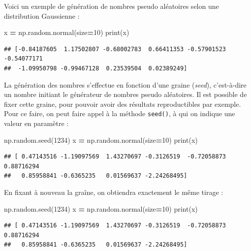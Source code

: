 \documentclass[12pt,]{book}
\newenvironment{Shaded}{\begin{snugshade}}{\end{snugshade}}
\newcommand{\DecValTok}[1]{\textcolor[rgb]{0.00,0.00,0.81}{#1}}
\newcommand{\OperatorTok}[1]{\textcolor[rgb]{0.81,0.36,0.00}{\textbf{#1}}}
\newcommand{\BuiltInTok}[1]{#1}
\newcommand{\NormalTok}[1]{#1}
\numberwithin{equation}{section}
\numberwithin{countremarque}{section}
\begin{document}
Voici un exemple de génération de nombres pseudo aléatoires selon une
distribution Gaussienne :

\begin{Shaded}
\begin{Highlighting}[]
\NormalTok{x }\OperatorTok{=}\NormalTok{ np.random.normal(size}\OperatorTok{=}\DecValTok{10}\NormalTok{)}
\BuiltInTok{print}\NormalTok{(x)}
\end{Highlighting}
\end{Shaded}

\begin{lstlisting}
## [-0.84187605  1.17502807 -0.68002783  0.66411353 -0.57901523 -0.54077171
##  -1.09950798 -0.99467128  0.23539504  0.02389249]
\end{lstlisting}

La génération des nombres s'effectue en fonction d'une graine
(\emph{seed}), c'est-à-dire un nombre initiant le générateur de nombres
pseudo aléatoires. Il est possible de fixer cette graine, pour pouvoir
avoir des résultats reproductibles par exemple. Pour ce faire, on peut
faire appel à la méthode \texttt{seed()}, à qui on indique une valeur en
paramètre :

\begin{Shaded}
\begin{Highlighting}[]
\NormalTok{np.random.seed(}\DecValTok{1234}\NormalTok{)}
\NormalTok{x }\OperatorTok{=}\NormalTok{ np.random.normal(size}\OperatorTok{=}\DecValTok{10}\NormalTok{)}
\BuiltInTok{print}\NormalTok{(x)}
\end{Highlighting}
\end{Shaded}

\begin{lstlisting}
## [ 0.47143516 -1.19097569  1.43270697 -0.3126519  -0.72058873  0.88716294
##   0.85958841 -0.6365235   0.01569637 -2.24268495]
\end{lstlisting}

En fixant à nouveau la graîne, on obtiendra exactement le même tirage :

\begin{Shaded}
\begin{Highlighting}[]
\NormalTok{np.random.seed(}\DecValTok{1234}\NormalTok{)}
\NormalTok{x }\OperatorTok{=}\NormalTok{ np.random.normal(size}\OperatorTok{=}\DecValTok{10}\NormalTok{)}
\BuiltInTok{print}\NormalTok{(x)}
\end{Highlighting}
\end{Shaded}

\begin{lstlisting}
## [ 0.47143516 -1.19097569  1.43270697 -0.3126519  -0.72058873  0.88716294
##   0.85958841 -0.6365235   0.01569637 -2.24268495]
\end{lstlisting}
\end{document}
